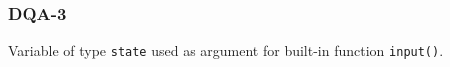 \subsubsection{DQA-3}\label{sec:error_code_dqa_3}

Variable of type \texttt{state} used as argument for built-in function \texttt{input()}.


